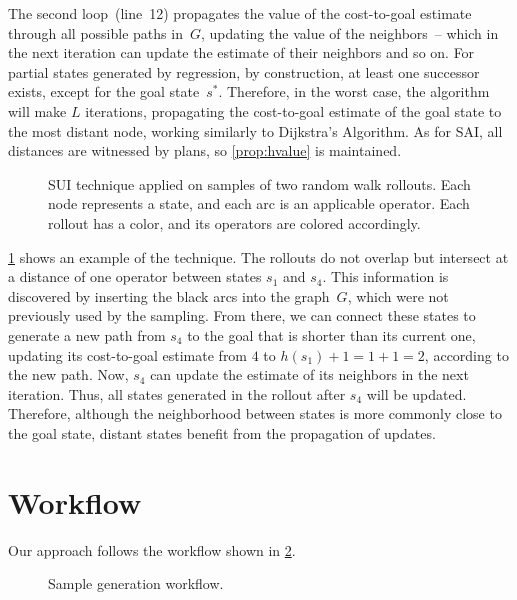 The second loop~(line~12) propagates the value of the cost-to-goal estimate through all possible paths in~$G$, updating the value of the neighbors~-- which in the next iteration can update the estimate of their neighbors and so on. For partial states generated by regression, by construction, at least one successor exists, except for the goal state~$s^*$. Therefore, in the worst case, the algorithm will make $L$ iterations, propagating the cost-to-goal estimate of the goal state to the most distant node, working similarly to Dijkstra's Algorithm. As for SAI, all distances are witnessed by plans, so \cref{prop:hvalue} is maintained.

\begin{figure}[ht]
    \caption[SUI technique applied on samples of random walk rollouts.]{SUI technique applied on samples of two random walk rollouts. Each node represents a state, and each arc is an applicable operator. Each rollout has a color, and its operators are colored accordingly.}
    \label{fig:sui}
    \addmargin
    \centering
    
\end{figure}

\cref{fig:sui} shows an example of the technique. The rollouts do not overlap but intersect at a distance of one operator between states $s_1$ and $s_4$. This information is discovered by inserting the black arcs into the graph~$G$, which were not previously used by the sampling. From there, we can connect these states to generate a new path from $s_4$ to the goal that is shorter than its current one, updating its cost-to-goal estimate from $4$ to $h(s_1)+1=1+1=2$, according to the new path. Now, $s_4$ can update the estimate of its neighbors in the next iteration. Thus, all states generated in the rollout after $s_4$ will be updated. Therefore, although the neighborhood between states is more commonly close to the goal state, distant states benefit from the propagation of updates.

\section{Workflow}
\label{sec:workflow}

Our approach follows the workflow shown in \cref{fig:workflow}.

\begin{figure}[ht]
    \caption{Sample generation workflow.}
    \label{fig:workflow}
    \addmargin
    \centering
    
\end{figure}

